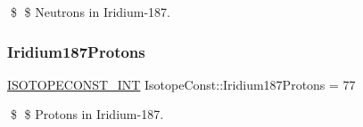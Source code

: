 \$ \$ Neutrons in Iridium-\/187. \mbox{\label{group___isotope_const-_iridium-_ir187_gacff19206e6957373370517a11e58c83c}} 
\subsubsection{\texorpdfstring{Iridium187\+Protons}{Iridium187Protons}}
{\footnotesize\ttfamily \mbox{\hyperlink{group___isotope_const-_macros_ga5f18360b3e99483a35c32d789e62621c}{I\+S\+O\+T\+O\+P\+E\+C\+O\+N\+S\+T\+\_\+\+I\+NT}} Isotope\+Const\+::\+Iridium187\+Protons = 77}

\$ \$ Protons in Iridium-\/187. 